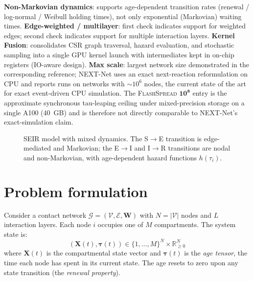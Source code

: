 \documentclass[a4paper,fleqn]{cas-sc}
\theoremstyle{definition}
\theoremstyle{remark}
\newcommand{\flashspread}{\textsc{FlashSpread}}
\begin{document}
\begin{table}[t]
\begin{threeparttable}
\begin{tabular*}{\tblwidth}{@{\extracolsep{\fill}}lccccccl@{}}
\bottomrule
\end{tabular*}
\begin{tablenotes}
\footnotesize
\item \textbf{Non-Markovian dynamics}: supports age-dependent transition rates (renewal / log-normal / Weibull holding times), not only exponential (Markovian) waiting times. \textbf{Edge-weighted / multilayer}: first check indicates support for weighted edges; second check indicates support for multiple interaction layers. \textbf{Kernel Fusion}: consolidates CSR graph traversal, hazard evaluation, and stochastic sampling into a single GPU kernel launch with intermediates kept in on-chip registers (IO-aware design). \textbf{Max scale}: largest network size demonstrated in the corresponding reference; NEXT-Net \citep{cure2025fast} uses an exact next-reaction reformulation on CPU and reports runs on networks with $\sim$$10^6$ nodes, the current state of the art for exact event-driven CPU simulation. The \flashspread{} $\mathbf{10^8}$ entry is the approximate synchronous tau-leaping ceiling under mixed-precision storage on a single A100 (40~GB) and is therefore not directly comparable to NEXT-Net's exact-simulation claim.
\end{tablenotes}
\end{threeparttable}
\end{table}

\begin{figure}[!h]
\centering

\caption{SEIR model with mixed dynamics. The S$\to$E transition is edge-mediated and Markovian; the E$\to$I and I$\to$R transitions are nodal and non-Markovian, with age-dependent hazard functions $h(\tau_i)$.}
\label{fig:seir}
\end{figure}

\section{Problem formulation}\label{sec:formulation}

Consider a contact network $\mathcal{G} = (\mathcal{V}, \mathcal{E}, \mathbf{W})$ with $N = |\mathcal{V}|$ nodes and $L$ interaction layers. Each node $i$ occupies one of $M$ compartments. The system state is:
\begin{equation}
    (\mathbf{X}(t), \bm{\tau}(t)) \in \{1,\ldots,M\}^N \times \mathbb{R}_{\geq 0}^N
\end{equation}
where $\mathbf{X}(t)$ is the compartmental state vector and $\bm{\tau}(t)$ is the \emph{age tensor}, the time each node has spent in its current state. The age resets to zero upon any state transition (the \emph{renewal property}).
\end{document}
